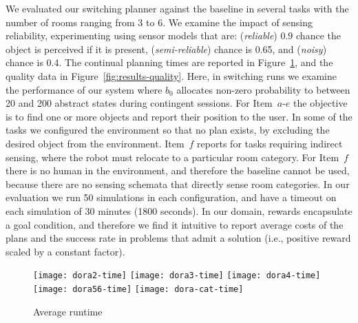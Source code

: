
We evaluated our switching planner against the baseline in several
tasks with the number of rooms ranging from 3 to 6. We examine the
impact of sensing reliability, experimenting using sensor models that
are: ({\em reliable}) $0.9$ chance the object is perceived if it is
present, ({\em semi-reliable}) chance is 0.65, and ({\em noisy})
chance is 0.4. The continual planning times are reported in
Figure~\ref{fig:results-time}, and the quality data in
Figure~\ref{fig:results-quality}. Here, in switching runs we examine
the performance of our system where $b_0$ allocates non-zero
probability to between 20 and 200 abstract states during contingent
sessions. For Item~$a$-$e$ the objective is to find one or more
objects and report their position to the user. In some of the tasks we
configured the environment so that no plan exists, by excluding the
desired object from the environment. Item~$f$ reports for tasks
requiring indirect sensing, where the robot must relocate to a
particular room category. For Item~$f$ there is no human in the
environment, and therefore the baseline cannot be used, because there
are no sensing schemata that directly sense room categories. In our
evaluation we run 50 simulations in each configuration, and have a
timeout on each simulation of 30 minutes (1800 seconds). In our domain,
rewards encapsulate a goal condition, and therefore we find it
intuitive to report average costs of the plans and the success rate in
problems that admit a solution (i.e., positive reward scaled by a
constant factor).



\begin{figure}[h!]
  \texttt{[image: dora2-time]}\hfill
  \texttt{[image: dora3-time]}\hfill
  \texttt{[image: dora4-time]}\hfill
  \vspace{2mm}
  \texttt{[image: dora56-time]}\hfill
  \vspace{2mm}
  \texttt{[image: dora-cat-time]}\hfill
  \caption{Average runtime}
  \label{fig:results-time}
\end{figure}

